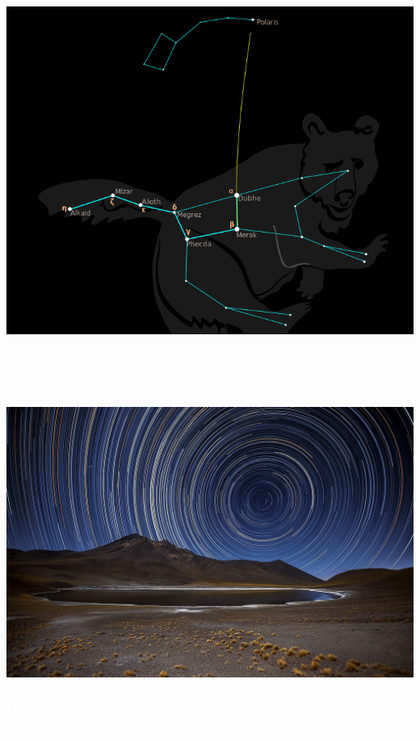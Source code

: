 \documentclass[aspectratio=169,xcolor=pdftex,dvipsnames]{beamer} %
\begin{document}
{
{
    \includegraphics[width=\paperwidth,height=\paperheight]{ursaMajor.png}
}
\begin{frame}
\frametitle{\textcolor{white}{Prehistoric times:\\ constellations}}
 
\end{frame}
}



{
{
    \includegraphics[width=\paperwidth]{starTrails.jpg}
}
\begin{frame}
\frametitle{\textcolor{white}{Prehistoric times: star trails, pole star\\
Phoenicia: navigation by the pole star}}
 
\end{frame}
}
\end{document}
